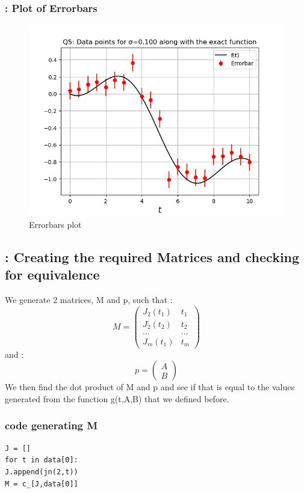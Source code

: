 \documentclass[11pt]{article}
\begin{document}
\subsubsection{: Plot of Errorbars}
\begin{figure}[H]
    \centering
    \includegraphics[scale = 0.75]{Figure_2.png}
    \caption{Errorbars plot}
\end{figure}

\subsection{: Creating the required Matrices and checking for equivalence}
We generate 2 matrices, M and p, such that :
\begin{equation}
M = 
\left(\begin{array}{cc} J_2(t_1) & t_1\\ J_2(t_2) & t_2\\... & ...\\J_m(t_1) & t_m \end{array}\right)
\end{equation}
and :
\begin{equation}
p = 
\left(\begin{array}{cc} A\\B \end{array}\right)
\end{equation}
We then find the dot product of M and p and see if that is equal to the values generated from the function g(t,A,B) that we defined before.

\subsubsection{code generating M}
\begin{verbatim}
J = []
for t in data[0]:
J.append(jn(2,t))
M = c_[J,data[0]]
\end{verbatim}
\end{document}
